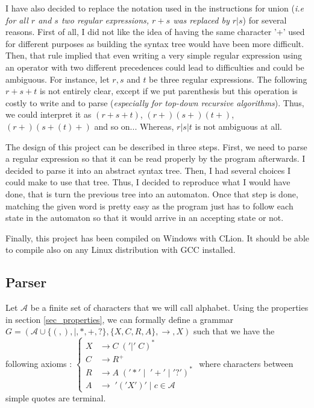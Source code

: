 \documentclass[a4paper,11pt,titlepage]{article}
\begin{document}
\pagebreak
\label{sec_alter}
I have also decided to replace the notation used in the instructions for union (\textit{i.e for all $r$ and $s$ two regular expressions, $r+s$ was replaced by $r|s$}) for several reasons. First of all, I did not like the idea of having the same character '+' used for different purposes as building the syntax tree would have been more difficult. Then, that rule implied that even writing a very simple regular expression using an operator with two different precedences could lead to difficulties and could be ambiguous. For instance, let $r, s$ and $t$ be three regular expressions. The following $r+s+t$ is not entirely clear, except if we put parenthesis but this operation is costly to write and to parse (\textit{especially for top-down recursive algorithms}). Thus, we could interpret it as $(r+s+t)$, $(r+)(s+)(t+)$, $(r+)(s+(t)+)$ and so on... Whereas, $r|s|t$ is not ambiguous at all.

The design of this project can be described in three steps. First, we need to parse a regular expression so that it can be read properly by the program afterwards. I decided to parse it into an abstract syntax tree. Then, I had several choices I could make to use that tree. Thus, I decided to reproduce what I would have done, that is turn the previous tree into an automaton. Once that step is done, matching the given word is pretty easy as the program just has to follow each state in the automaton so that it would arrive in an accepting state or not.

Finally, this project has been compiled on Windows with CLion. It should be able to compile also on any Linux distribution with GCC installed.

\subsection{Parser}

Let $\mathcal{A}$ be a finite set of characters that we will call alphabet. Using the properties in section \ref{sec_properties}, we can formally define a grammar $G=(\mathcal{A}\cup\{(,),|,*,+,?\},\{X,C,R,A\},\to,X)$ such that we have the following axioms : $\left\{\begin{array}{ll}
    X &\to C\;('|'\;C)^*\\
    C&\to R^+\\
    R&\to A\;('*'\;|\;\;'+'\;|\;'?')^*\\
    A&\to \;'('X')'\;|\;c\in\mathcal{A}
\end{array}\right.$ where characters between simple quotes are terminal.
\end{document}
